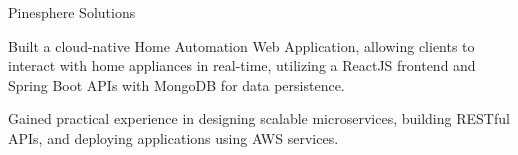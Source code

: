 
   {Pinesphere Solutions} {}
    \resumeItemListStart                
          {
    \item Built a cloud-native Home Automation Web Application, allowing clients to interact with home appliances in real-time, utilizing a ReactJS frontend and Spring Boot APIs with MongoDB for data persistence.
  \item Gained practical experience in designing scalable microservices, building RESTful APIs, and deploying applications using AWS services.
  }
\resumeItemListEnd

\resumeSubHeadingListEnd
\vspace{5pt}


